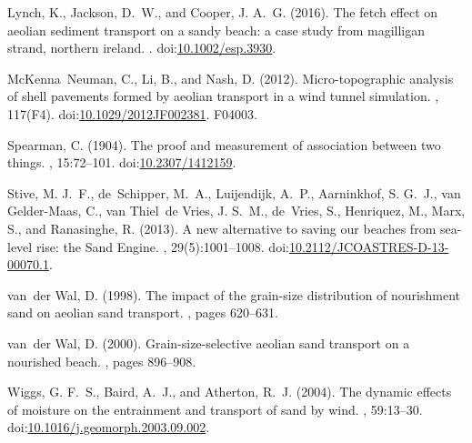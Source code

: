\documentclass[preprint,12pt,authoryear,a4paper]{elsarticle}
\begin{document}
\begin{thebibliography}{}
Lynch, K., Jackson, D.~W., and Cooper, J. A.~G. (2016).
\newblock The fetch effect on aeolian sediment transport on a sandy beach: a
  case study from magilligan strand, northern ireland.
.
\newblock doi:\href{http://dx.doi.org/10.1002/esp.3930}{10.1002/esp.3930}.

McKenna~Neuman, C., Li, B., and Nash, D. (2012).
\newblock Micro-topographic analysis of shell pavements formed by aeolian
  transport in a wind tunnel simulation.
, 117(F4).
\newblock
  doi:\href{http://dx.doi.org/10.1029/2012JF002381}{10.1029/2012JF002381}.
\newblock F04003.

Spearman, C. (1904).
\newblock The proof and measurement of association between two things.
, 15:72--101.
\newblock doi:\href{http://dx.doi.org/10.2307/1412159}{10.2307/1412159}.

Stive, M. J.~F., de~Schipper, M.~A., Luijendijk, A.~P., Aarninkhof, S. G.~J.,
  van Gelder-Maas, C., van Thiel~de Vries, J. S.~M., de~Vries, S., Henriquez,
  M., Marx, S., and Ranasinghe, R. (2013).
\newblock A new alternative to saving our beaches from sea-level rise: the
  {S}and {E}ngine.
, 29(5):1001--1008.
\newblock
  doi:\href{http://dx.doi.org/10.2112/JCOASTRES-D-13-00070.1}{10.2112/JCOASTRES-D-13-00070.1}.

van~der Wal, D. (1998).
\newblock The impact of the grain-size distribution of nourishment sand on
  aeolian sand transport.
, pages 620--631.

van~der Wal, D. (2000).
\newblock Grain-size-selective aeolian sand transport on a nourished beach.
, pages 896--908.

Wiggs, G. F.~S., Baird, A.~J., and Atherton, R.~J. (2004).
\newblock The dynamic effects of moisture on the entrainment and transport of
  sand by wind.
, 59:13--30.
\newblock
  doi:\href{http://dx.doi.org/10.1016/j.geomorph.2003.09.002}{10.1016/j.geomorph.2003.09.002}.

\end{thebibliography}
\end{document}
